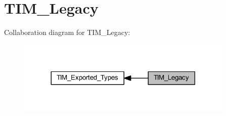 \hypertarget{group___t_i_m___legacy}{}\section{T\+I\+M\+\_\+\+Legacy}
\label{group___t_i_m___legacy}
Collaboration diagram for T\+I\+M\+\_\+\+Legacy\+:
\nopagebreak
\begin{figure}[H]
\begin{center}
\leavevmode
\includegraphics[width=293pt]{group___t_i_m___legacy}
\end{center}
\end{figure}
